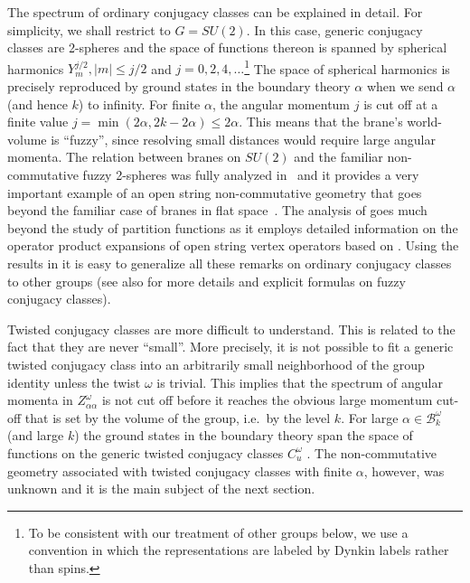 \documentclass[12pt,a4paper]{article}
\newcommand{\mc}{\mathcal} %
\def\bL{\mc{B}} %
\def\tareps{\bL^\omega_k} %
\def\om{\omega}
\def\a{\alpha}
\begin{document}
The spectrum of ordinary conjugacy classes can be explained 
in detail. For simplicity, we shall restrict to 
$G = SU(2)$. In this case, generic conjugacy classes are 
2-spheres and the space of functions thereon is spanned 
by spherical harmonics $Y^{j/2}_m, |m| \leq j/2$ and $j = 
0,2,4,\dots$\footnote{To be consistent with our 
treatment of other groups below, we use a convention in which 
the representations are labeled by Dynkin labels rather than spins.}  
The space of spherical harmonics is precisely 
reproduced by ground states in the boundary theory 
$\alpha$ when we send $\a$ (and hence $k$) to infinity. 
For finite $\a$, the angular momentum $j$ is cut off at a 
finite value $j = \min(2\a, 2k-2\a) \leq 2 \a$. This means
that the brane's world-volume is ``fuzzy'', since resolving 
small distances would require large angular momenta. The
relation between branes on $SU(2)$ and the familiar non-%
commutative fuzzy 2-spheres \cite{Hoppe:1989gk, Madore:1992bw}
was fully analyzed 
in~\cite{Alekseev:1999bs} and it provides a very important  
example of an open string non-commutative geometry that goes 
beyond the familiar case of branes in flat space~\cite{Douglas:1998fm,
Chu:1998qz, Schomerus:1999ug}. 
The analysis of \cite{Alekseev:1999bs} goes much beyond the study
of partition functions as it employs detailed information
on the operator product expansions of open string vertex
operators based on \cite{Runkel:1998pm}. Using the results in 
\cite{Felder:1999ka, Felder:1999cv, Felder:1999mq} it is
easy to generalize all these remarks 
on ordinary conjugacy classes to other groups (see also 
\cite{Hoppe:1989gk} for more details and explicit formulas on 
fuzzy conjugacy classes).  
\smallskip

Twisted conjugacy classes are more difficult to understand. 
This is related to the fact that they are never ``small''. More
precisely, it is not possible to fit a generic twisted conjugacy 
class into an arbitrarily small neighborhood of the group identity 
unless the twist $\omega$ is trivial. This implies that the 
spectrum of angular momenta in $Z_{\a\a}^\om$ is not cut off 
before it reaches the obvious large momentum cut-off that is 
set by the volume of the group, i.e.\ by the level $k$. For
large $\a\in\tareps$ (and large $k$) the ground states in the boundary 
theory span the space of functions on the generic twisted conjugacy 
classes $C^\om_u$ \cite{Felder:1999ka}. The non-commutative geometry 
associated with twisted conjugacy classes with finite $\a$, however, 
was unknown and it is the main subject of the next section.     
\end{document}
